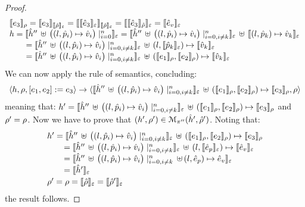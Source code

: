 \begin{proof}
$$\begin{array}{l}
  \symbeval{\jsilexpr_3}{\store}  = \symbeval{\jsilexpr_3}{\semexpr{\sstore}{\senv}} =  \symbeval{\symbeval{\sexpr_3}{\senv}}{\symbeval{\sstore}{\senv}} = \symbeval{\symbeval{\sexpr_3}{\sstore}}{\senv}
   =  \symbeval{\sexpr_v}{\senv} \\
 \heap = \semexpr{\sheap'' \, \uplus \, \big((l, \sexprp_i) \mapsto \sexprv_i\big)\mid_{i = 0}^n}{\senv} 
       =  \semexpr{\sheap'' \, \uplus \, \big((l, \sexprp_i) \mapsto \sexprv_i\big)\mid_{i = 0, i \neq k}^n}{\senv} \dunion \semexpr{(l, \sexprp_k) \mapsto \sexprv_k}{\senv} \\
         \qquad = \semexpr{\sheap'' \, \uplus \, \big((l, \sexprp_i) \mapsto \sexprv_i\big)\mid_{i = 0, i \neq k}^n}{\senv} \dunion (l, \semexpr{\sexprp_k}{\senv}) \mapsto \semexpr{\sexprv_k}{\senv}  \\ 
         \qquad =  \semexpr{\sheap'' \, \uplus \, \big((l, \sexprp_i) \mapsto \sexprv_i\big)\mid_{i = 0, i \neq k}^n}{\senv} \dunion (\symbeval{\jsilexpr_1}{\store}, \symbeval{\jsilexpr_2}{\store}) \mapsto \semexpr{\sexprv_k}{\senv} \\ 
\end{array}
$$
We can now apply the  rule of \jsil semantics, concluding: 
$$
   \semtrans{\heap, \store, [\jsilexpr_1, \jsilexpr_2] := \jsilexpr_3}
     {\semexpr{\sheap'' \, \uplus \, \big((l, \sexprp_i) \mapsto \sexprv_i\big)\mid_{i = 0, i \neq k}^n}{\senv} \dunion (\symbeval{\jsilexpr_1}{\store}, \symbeval{\jsilexpr_2}{\store}) \mapsto \symbeval{\jsilexpr_3}{\store},  \store}
$$
meaning that: 
$\heap' = \symbeval{\sheap'' \, \uplus \, \big((l, \sexprp_i) \mapsto \sexprv_i\big)\mid_{i = 0, i \neq k}^n}{\senv} \dunion (\symbeval{\jsilexpr_1}{\store}, \symbeval{\jsilexpr_2}{\store}) \mapsto \symbeval{\jsilexpr_3}{\store}$ and 
$\store' = \store$.
Now we have to prove that $(\heap', \store') \in \smodels{\sheap', \sstore'}{\pc''}$.
Noting that:
$$
\begin{array}{l}
\heap' = \symbeval{\sheap'' \, \uplus \, \big((l, \sexprp_i) \mapsto \sexprv_i\big)\mid_{i = 0, i \neq k}^n}{\senv} \dunion (\symbeval{\jsilexpr_1}{\store}, \symbeval{\jsilexpr_2}{\store}) \mapsto \symbeval{\jsilexpr_3}{\store} \\ 
  \qquad = \symbeval{\sheap'' \, \uplus \, \big((l, \sexprp_i) \mapsto \sexprv_i\big)\mid_{i = 0, i \neq k}^n}{\senv} \dunion (\loc, \symbeval{\sexpr_p}{\senv}) \mapsto \symbeval{\sexpr_v}{\senv}  \\
    \qquad = \symbeval{\sheap'' \, \uplus \, \big((l, \sexprp_i) \mapsto \sexprv_i\big)\mid_{i = 0, i \neq k}^n \dunion (\loc, \sexpr_p) \mapsto \sexpr_v}{\senv}  \\
    \qquad = \symbeval{\sheap'}{\senv} \\[2pt]
 \store' = \store = \symbeval{\sstore}{\senv} = \symbeval{\sstore'}{\senv} 
\end{array}
$$
the result follows. 
\vspace{6pt}


\end{proof}
